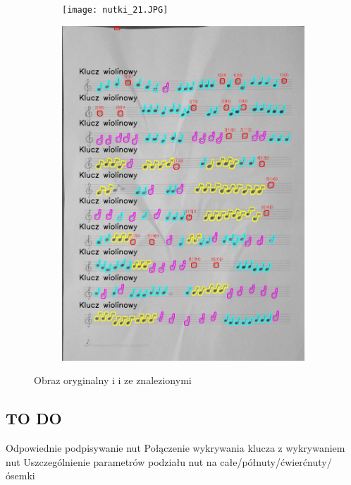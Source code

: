 \documentclass[11pt]{article}
\begin{document}
    \begin{figure}[H]
        \centering
        \begin{subfigure}{.5\textwidth}
            \centering
            \graphicspath{ {Resources/} }
            \texttt{[image: nutki\_21.JPG]}
            \label{figsub1}
        \end{subfigure}%
        \begin{subfigure}{.5\textwidth}
            \centering
            \graphicspath{ {keys/} }
            \includegraphics[width=\linewidth]{image_21.jpg}
            \label{figsub2}
        \end{subfigure}
        \caption{Obraz oryginalny i i ze znalezionymi }
        \label{figwygKlucze02}
    \end{figure}
    

\subsection{TO DO}
Odpowiednie podpisywanie nut \newline
Połączenie wykrywania klucza z wykrywaniem nut\newline
Uszczególnienie parametrów podziału nut na całe/półnuty/ćwierćnuty/ósemki\newline
\end{document}
